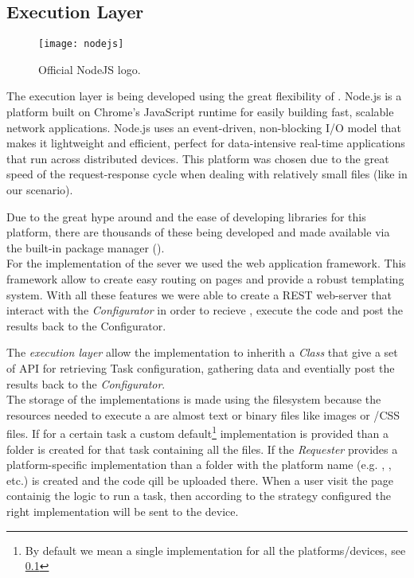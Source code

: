\subsection{Execution Layer}
\begin{figure}[htb]
    \centering
    \texttt{[image: nodejs]}
    \caption{Official NodeJS logo.}
    \label{fig:node-logo}
\end{figure}
The execution layer is being developed using the great flexibility of .
Node.js is a platform built on Chrome's JavaScript runtime for easily building fast,
scalable network applications. Node.js uses an event-driven, non-blocking I/O model
that makes it lightweight and efficient, perfect for data-intensive real-time
applications that run across distributed devices.
This platform was chosen due to the great speed of the request-response cycle
when dealing with relatively small files (like in our scenario).

Due to the great hype around  and the ease of developing
libraries for this platform, there are thousands of these being developed and
made available via the built-in package manager ().\\

For the implementation of the sever we used the  web
application framework. This framework allow to create easy routing on pages and
provide a robust templating system. With all these features we were able to
create a REST web-server that interact with the \emph{Configurator} in order to
recieve \utask{}, execute the code and post the results back to the Configurator.

The \emph{execution layer} allow the \utask{} implementation to inherith a
\js{} \emph{Class} that give a set of API for retrieving Task configuration,
gathering data and eventially post the \utask{} results back to the
\emph{Configurator}.\\

The storage of the \utask{} implementations is made using the filesystem because
the resources needed to execute a \utask{} are almost text or binary files like
images or \js{}/\ac{CSS} files. If for a certain task a custom default\footnote{
By default we mean a single implementation for all the platforms/devices, see
\ref{} } implementation is provided than a  folder is created for
that task containing all the files. If the \emph{Requester} provides a
platform-specific implementation than a folder with the platform name (e.g.
, , etc.) is created and the code qill be uploaded
there. When a user visit the page containig the logic to run a task, then according
to the strategy configured the right implementation will be sent to the device.


